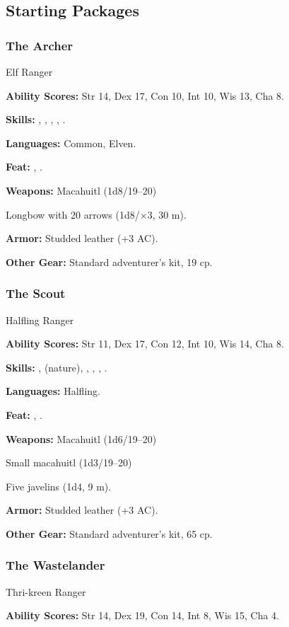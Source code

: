 \subsection{Starting Packages}
\subsubsection{The Archer}
Elf Ranger

\textbf{Ability Scores:} Str 14, Dex 17, Con 10, Int 10, Wis 13, Cha 8.

\textbf{Skills:} , , , , .

\textbf{Languages:} Common, Elven.

\textbf{Feat:} , .

\textbf{Weapons:} Macahuitl (1d8/19--20)

Longbow with 20 arrows (1d8/$\times$3, 30 m).

\textbf{Armor:} Studded leather (+3 AC).

\textbf{Other Gear:} Standard adventurer's kit, 19 cp.

\subsubsection{The Scout}
Halfling Ranger

\textbf{Ability Scores:} Str 11, Dex 17, Con 12, Int 10, Wis 14, Cha 8.

\textbf{Skills:} ,  (nature), , , , .

\textbf{Languages:} Halfling.

\textbf{Feat:} , .

\textbf{Weapons:} Macahuitl (1d6/19--20)

Small macahuitl (1d3/19--20)

Five javelins (1d4, 9 m).

\textbf{Armor:} Studded leather (+3 AC).

\textbf{Other Gear:} Standard adventurer's kit, 65 cp.

\subsubsection{The Wastelander}
Thri-kreen Ranger

\textbf{Ability Scores:} Str 14, Dex 19, Con 14, Int 8, Wis 15, Cha 4.

